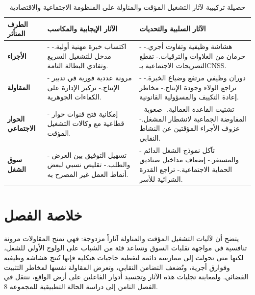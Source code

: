 \begin{table}[htbp]
\centering
\small
\renewcommand{\arraystretch}{1.5}
\begin{tabularx}{\textwidth}{|p{2.7cm}|X|X|}
\hline
\rowcolor{maincolor!20}
\textbf{الطرف المتأثر} & \textbf{الآثار الإيجابية والمكاسب} & \textbf{الآثار السلبية والتحديات} \\
\hline
\textbf{الأجراء} & - اكتساب خبرة مهنية أولية.\newline - مدخل للتشغيل السريع وتفادي البطالة التامة. & - هشاشة وظيفية وتفاوت أجري.\newline - حرمان من العلاوات والترقيات.\newline - تقطع التصريحات الاجتماعية بـ\textenglish{CNSS}. \\
\hline
\textbf{المقاولة} & - مرونة عددية فورية في تدبير الإنتاج.\newline - تركيز الإدارة على الكفاءات الجوهرية. & - دوران وظيفي مرتفع وضياع الخبرة.\newline - تراجع الولاء وجودة الإنتاج.\newline - مخاطر إعادة التكييف والمسؤولية القانونية. \\
\hline
\textbf{الحوار الاجتماعي} & - إمكانية فتح قنوات حوار قطاعية مع وكالات التشغيل المؤقت. & - تشتيت القاعدة العمالية.\newline - صعوبة المفاوضة الجماعية لانشطار المشغل.\newline - عزوف الأجراء المؤقتين عن النشاط النقابي. \\
\hline
\textbf{سوق الشغل} & - تسهيل التوفيق بين العرض والطلب.\newline - تقليص نسبي لبعض أنماط العمل غير المصرح به. & - تآكل نموذج الشغل الدائم والمستقر.\newline - إضعاف مداخيل صناديق الحماية الاجتماعية.\newline - تراجع القدرة الشرائية للأسر. \\
\hline
\end{tabularx}
\caption{حصيلة تركيبية لآثار التشغيل المؤقت والمناولة على المنظومة الاجتماعية والاقتصادية}
\label{tab:synthese-impacts}
\end{table}

\section*{خلاصة الفصل}

يتضح أن لآليات التشغيل المؤقت والمناولة آثاراً مزدوجة: فهي تمنح المقاولات مرونة تنافسية في مواجهة تقلبات السوق وتساعد فئة من الشباب على الولوج الأولي للشغل، لكنها متى تحولت إلى ممارسة دائمة لتغطية حاجيات هيكلية فإنها تُنتج هشاشة وظيفية وفوارق أجرية، وتُضعف التضامن النقابي، وتعرض المقاولة نفسها لمخاطر التثبيت القضائي. ولمعاينة تجليات هذه الآثار وتجسيد أدوار الفاعلين على أرض الواقع، ننتقل في الفصل الثامن إلى دراسة الحالة التطبيقية للمجموعة \textenglish{8}.

